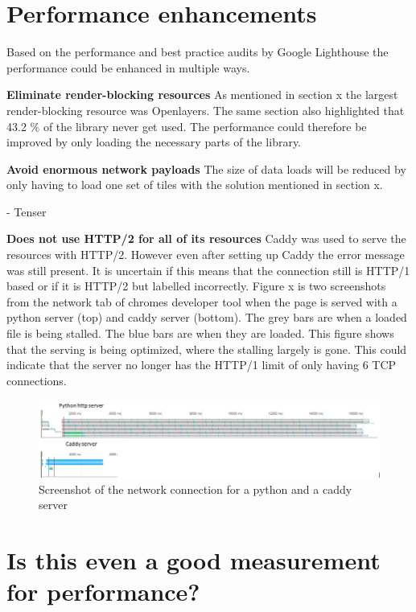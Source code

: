 \section{Performance enhancements}

Based on the performance and best practice audits by Google Lighthouse the performance could be enhanced in multiple ways. 

\textbf{Eliminate render-blocking resources}
As mentioned in section x the largest render-blocking resource was Openlayers. The same section also highlighted that 43.2 \% of the library never get used. The performance could therefore be improved by only loading the necessary parts of the library. 
\citep{OlModule}

\textbf{Avoid enormous network payloads}
The size of data loads will be reduced by only having to load one set of tiles with the solution mentioned in section x. 

-	Tenser 


\textbf{Does not use HTTP/2 for all of its resources}
Caddy was used to serve the resources with HTTP/2. However even after setting up Caddy the error message was still present. It is uncertain if this means that the connection still is HTTP/1 based or if it is HTTP/2 but labelled incorrectly. Figure x is two screenshots from the network tab of chromes developer tool when the page is served with a python server (top) and caddy server (bottom). 
The grey bars are when a loaded file is being stalled. The blue bars are when they are loaded. This figure shows that the serving is being optimized, where the stalling largely is gone. This could indicate that the server no longer has the HTTP/1 limit of only having 6 TCP connections.

\begin{figure} [H]
	\centering
	\includegraphics[width=.8\textwidth]{Pictures/CaddyVsPython}
	\caption{Screenshot of the network connection for a python and a caddy server}
	\label{CaddyVsPython}
\end{figure}


 

\section{Is this even a good measurement for performance?}
